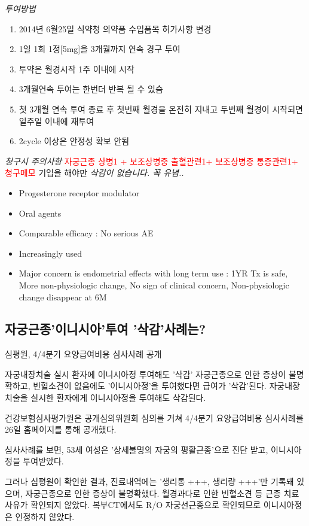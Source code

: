 {
\emph{투여방법}
\begin{enumerate}\tightlist
\item 2014년 6월25일 식약청 의약품 수입품목 허가사항 변경
\item 1일 1회 1정[5mg]을 3개월까지 연속 경구 투여
\item 투약은 월경시작 1주 이내에 시작
\item 3개월연속 투여는 한번더 반복 될 수 있슴
\item 첫 3개월 연속 투여 종료 후 첫번째 월경을 온전히 지내고 두번째 월경이 시작되면 일주일 이내에 재투여
\item 2cycle 이상은 안정성 확보 안됨
\end{enumerate}
\emph{청구시 주의사항}
\textcolor{red}{자궁근종 상병1 + 보조상병중 출혈관련1+ 보조상병중 통증관련1+ 청구메모 }
 기입을 해야만 \emph{삭감이 없습니다. 꼭 유념..}\par
\begin{itemize}\tightlist
\item Progesterone receptor modulator
\item Oral agents
\item Comparable efficacy : No serious AE
\item Increasingly used 
\item Major concern is endometrial effects with long term use : 1YR Tx is safe, More non-physiologic change, No sign of clinical concern, Non-physiologic change disappear at 6M
\end{itemize} 
}%
\subsection{자궁근종'이니시아'투여 '삭감'사례는?}
심평원, 4/4분기 요양급여비용 심사사례 공개 \par
자궁내장치술 실시 환자에 이니시아정 투여해도 '삭감'
자궁근종으로 인한 증상이 불명확하고, 빈혈소견이 없음에도 '이니시아정'을 투여했다면 급여가 '삭감'된다. 자궁내장치술을 실시한 환자에게 이니시아정을 투여해도 삭감된다.

건강보험심사평가원은 공개심의위원회 심의를 거쳐 4/4분기 요양급여비용 심사사례를 26일 홈페이지를 통해 공개했다.

심사사례를 보면, 53세 여성은 '상세불명의 자궁의 평활근종'으로 진단 받고, 이니시아정을 투여받았다.

그러나 심평원이 확인한 결과, 진료내역에는 '생리통 +++, 생리량 +++'만 기록돼 있으며, 자궁근종으로 인한 증상이 불명확했다. 월경과다로 인한 빈혈소견 등 근종 치료 사유가 확인되지 않았다. 복부CT에서도 R/O 자궁선근종으로 확인되므로 이니시아정은 인정하지 않았다.

